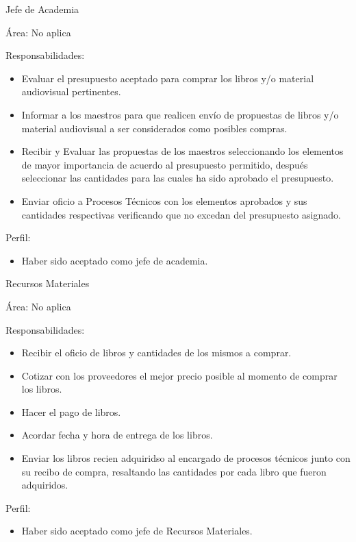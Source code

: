 \begin{Actor}{Jefe de Academia}{}
	\item[Área:] No aplica
	\item[Responsabilidades:] \hspace{1pt}
	\begin{itemize}
		\item Evaluar el presupuesto aceptado para comprar los libros y/o material audiovisual pertinentes.
		\item Informar a los maestros para que realicen envío de propuestas de libros y/o material audiovisual a ser considerados como posibles compras.
		\item Recibir y Evaluar las propuestas de los maestros seleccionando los elementos de mayor importancia de acuerdo al presupuesto permitido, después seleccionar las cantidades para las cuales ha sido aprobado el presupuesto.
		\item Enviar oficio a Procesos Técnicos con los elementos aprobados y sus cantidades respectivas verificando que no excedan del presupuesto asignado.
	\end{itemize}
	\item[Perfil:] \hspace{1pt}
	\begin{itemize}
		\item Haber sido aceptado como jefe de academia.
	\end{itemize}
\end{Actor}

\begin{Actor}{Recursos Materiales}{}
	\item[Área:] No aplica
	\item[Responsabilidades:] \hspace{1pt}
	\begin{itemize}
		\item Recibir el oficio de libros y cantidades de los mismos a comprar.
		\item Cotizar con los proveedores el mejor precio posible al momento de comprar los libros.
		\item Hacer el pago de libros.
		\item Acordar fecha y hora de entrega de los libros.
		\item Enviar los libros recien adquiridso al encargado de procesos técnicos junto con su recibo de compra, resaltando las cantidades por cada libro que fueron adquiridos.
	\end{itemize}
	\item[Perfil:] \hspace{1pt}
	\begin{itemize}
		\item Haber sido aceptado como jefe de Recursos Materiales.
	\end{itemize}
\end{Actor}


